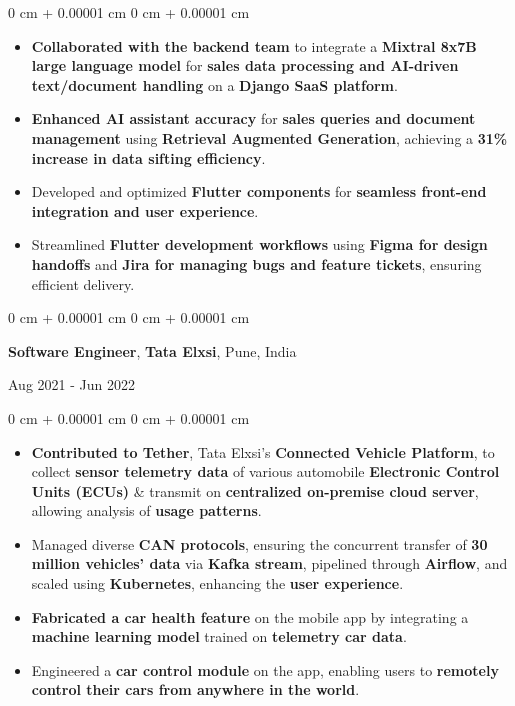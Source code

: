 \documentclass[10pt, letterpaper]{article}
\newenvironment{highlights}{
    \begin{itemize}[
        topsep=0.10 cm,
        parsep=0.10 cm,
        partopsep=0pt,
        itemsep=0pt,
        leftmargin=0 cm + 10pt
    ]
}{
    \end{itemize}
} %
\newenvironment{onecolentry}{
    \begin{adjustwidth}{
        0 cm + 0.00001 cm
    }{
        0 cm + 0.00001 cm
    }
}{
    \end{adjustwidth}
} %
\newenvironment{twocolentry}[2][]{
    \onecolentry
    \def\secondColumn{#2}
    \setcolumnwidth{\fill, 4.5 cm}
    \begin{paracol}{2}
}{
    \switchcolumn \raggedleft \secondColumn
    \end{paracol}
    \endonecolentry
} %
\begin{document}
    \begin{onecolentry}
        \begin{highlights}
            \item \textbf{Collaborated with the backend team} to integrate a \textbf{Mixtral 8x7B large language model} for \textbf{sales data processing and AI-driven text/document handling} on a \textbf{Django SaaS platform}.
            \item \textbf{Enhanced AI assistant accuracy} for \textbf{sales queries and document management} using \textbf{Retrieval Augmented Generation}, achieving a \textbf{31\% increase in data sifting efficiency}.
            \item Developed and optimized \textbf{Flutter components} for \textbf{seamless front-end integration and user experience}.
            \item Streamlined \textbf{Flutter development workflows} using \textbf{Figma for design handoffs} and \textbf{Jira for managing bugs and feature tickets}, ensuring efficient delivery.
        \end{highlights}
    \end{onecolentry}
    
    

    \vspace{0.10 cm}
    \begin{twocolentry}{
        Aug 2021 - Jun 2022
    }
        \textbf{Software Engineer}, \textbf{Tata Elxsi}, Pune, India
    \end{twocolentry}
    
    \begin{onecolentry}
        \begin{highlights}
            \item \textbf{Contributed to Tether}, Tata Elxsi’s \textbf{Connected Vehicle Platform}, to collect \textbf{sensor telemetry data} of various automobile \textbf{Electronic Control Units (ECUs)} \& transmit on \textbf{centralized on-premise cloud server}, allowing analysis of \textbf{usage patterns}.
            \item Managed diverse \textbf{CAN protocols}, ensuring the concurrent transfer of \textbf{30 million vehicles' data} via \textbf{Kafka stream}, pipelined through \textbf{Airflow}, and scaled using \textbf{Kubernetes}, enhancing the \textbf{user experience}.
            \item \textbf{Fabricated a car health feature} on the mobile app by integrating a \textbf{machine learning model} trained on \textbf{telemetry car data}.
            \item Engineered a \textbf{car control module} on the app, enabling users to \textbf{remotely control their cars from anywhere in the world}.
        \end{highlights}
    \end{onecolentry}
    
\end{document}
